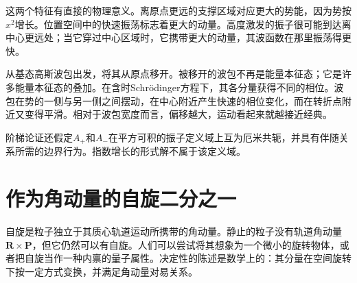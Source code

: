 这两个特征有直接的物理意义。离原点更远的支撑区域对应更大的势能，因为势按\(x^{2}\)增长。位置空间中的快速振荡标志着更大的动量。高度激发的振子很可能到达离中心更远处；当它穿过中心区域时，它携带更大的动量，其波函数在那里振荡得更快。

\begin{classroomqa}
\end{classroomqa}

从基态高斯波包出发，将其从原点移开。被移开的波包不再是能量本征态；它是许多能量本征态的叠加。在含时Schr\"odinger方程下，其各分量获得不同的相位。波包在势的一侧与另一侧之间摆动，在中心附近产生快速的相位变化，而在转折点附近又变得平滑。相对于波包宽度而言，偏移越大，运动看起来就越接近经典。

\begin{classroomqa}
\end{classroomqa}

阶梯论证还假定\(A_{+}\)和\(A_{-}\)在平方可积的振子定义域上互为厄米共轭，并具有伴随关系所需的边界行为。指数增长的形式解不属于该定义域。

\begin{classroomqa}
\end{classroomqa}

\section{作为角动量的自旋二分之一}

自旋是粒子独立于其质心轨道运动所携带的角动量。静止的粒子没有轨道角动量\(\mathbf R\times\mathbf P\)，但它仍然可以有自旋。人们可以尝试将其想象为一个微小的旋转物体，或者把自旋当作一种内禀的量子属性。决定性的陈述是数学上的：其分量在空间旋转下按一定方式变换，并满足角动量对易关系。

